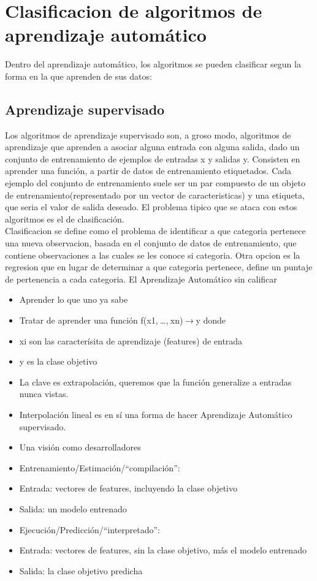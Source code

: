 \documentclass[a4paper,11pt,spanish]{book}
\begin{document}
  \section{Clasificacion de algoritmos de aprendizaje automático}
    Dentro del aprendizaje automático, los algoritmos se pueden clasificar segun la forma en la que aprenden de sus datos:

    \subsection{Aprendizaje supervisado}
      Los algoritmos de aprendizaje supervisado son, a groso modo, algoritmos de aprendizaje que aprenden a asociar alguna entrada con alguna salida, 
      dado un conjunto de entrenamiento de ejemplos de entradas x y salidas y.
      Consisten en aprender una función, a partir de datos de entrenamiento etiquetados. Cada ejemplo del conjunto de entrenamiento suele ser un par
      compuesto de un objeto de entrenamiento(representado por un vector de caracteristicas) y una etiqueta, que seria el valor de salida deseado.
      El problema tipico que se ataca con estos algoritmos es el de clasificación. \\
      Clasificacion se define como el problema de identificar a que categoria pertenece una nueva observacion,
      basada en el conjunto de datos de entrenamiento, que contiene observaciones a las cuales se les conoce si categoria.
      Otra opcion es la regresion que en lugar de determinar a que categoria pertenece, define un puntaje de pertenencia a cada categoria.
      El Aprendizaje Automático sin calificar
      \begin{itemize}
	\item Aprender lo que uno ya sabe
	\item Tratar de aprender una función f(x1, …, xn) → y donde
	\item xi son las caracterísita de aprendizaje (features) de entrada
	\item y es la clase objetivo
	\item La clave es extrapolación, queremos que la función generalize a entradas nunca vistas.
	\item Interpolación lineal es en sí una forma de hacer Aprendizaje Automático supervisado.
	\item Una visión como desarrolladores
	\item Entrenamiento/Estimación/“compilación”:
	\item Entrada: vectores de features, incluyendo la clase objetivo
	\item Salida: un modelo entrenado
	\item Ejecución/Predicción/“interpretado”:
	\item Entrada: vectores de features, sin la clase objetivo, más el modelo entrenado
	\item Salida: la clase objetivo predicha
      \end{itemize}
      
\end{document}
